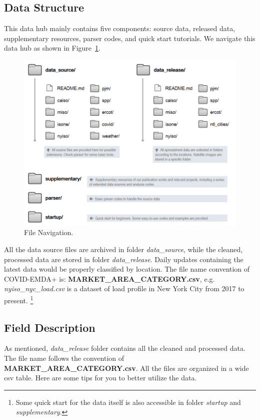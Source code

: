 \documentclass[11pt]{article}
\numberwithin{equation}{section}
\numberwithin{table}{section}
\numberwithin{figure}{section}
\begin{document}
\subsection{Data Structure}
This data hub mainly contains five components: source data, released data, supplementary resources, parser codes, and quick start tutorials. We navigate this data hub as shown in Figure~\ref{fig:filenavi}.
\begin{figure}[htbp]
	\centering
	\includegraphics[width=.8\textwidth]{figures/folder-structure-0725.png}
	\caption{File Navigation.}
	\label{fig:filenavi}
\end{figure}

All the data source files are archived in folder \textit{data\_source}, while the cleaned, processed data are stored in folder \textit{data\_release}. Daily updates containing the latest data would be properly classified by location. The file name convention of COVID-EMDA+ is: \textbf{MARKET\_AREA\_CATEGORY.csv}, e.g. \textit{nyiso\_nyc\_load.csv} is a dataset of load profile in New York City from 2017 to present.
\footnote{Some quick start for the data itself is also accessible in folder \textit{startup} and \textit{supplementary}.}

\subsection{Field Description}
As mentioned, \textit{data\_release} folder contains all the cleaned and processed data. The file name follows the convention of \textbf{MARKET\_AREA\_CATEGORY.csv}. 
All the files are organized in a wide csv table. Here are some tips for you to better utilize the data.
\end{document}
